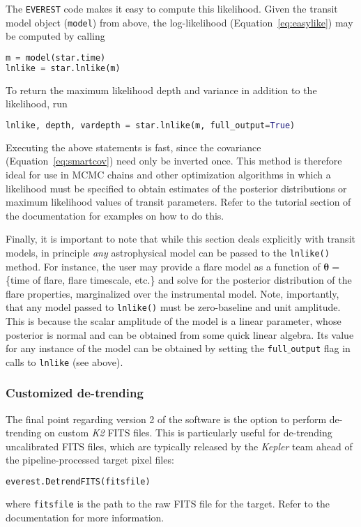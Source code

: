 \documentclass[]{emulateapj}
\newenvironment{edits}{\color{red}}{\color{black}}
\begin{document}
\begin{edits}
The \texttt{EVEREST} code makes it easy to compute this likelihood.
Given the transit model object (\texttt{model}) from above, the log-likelihood
(Equation~\ref{eq:easylike}) may be computed by calling
%
\begin{lstlisting}[language=Python]
m = model(star.time)
lnlike = star.lnlike(m)
\end{lstlisting}
%
To return the maximum likelihood depth and variance in addition to the
likelihood, run
%
\begin{lstlisting}[language=Python]
lnlike, depth, vardepth = star.lnlike(m, full_output=True)
\end{lstlisting}
%
Executing the above statements
is fast, since the covariance (Equation~\ref{eq:smartcov}) need only be
inverted once. This method is therefore ideal for use in MCMC chains and other
optimization algorithms in which a likelihood must be specified to
obtain estimates of the posterior distributions or maximum likelihood values
of transit parameters. Refer to the tutorial section of the documentation for
examples on how to do this.

Finally, it is important to note that while this section deals explicitly with
transit models, in principle \emph{any} astrophysical model can be passed to
the \texttt{lnlike()} method. For instance, the user may provide a flare model
as a function of $\mathbf{\theta} =$ \{time of flare, flare timescale, etc.\}
and solve for the posterior distribution of the flare properties, marginalized
over the instrumental model. Note, importantly, that any model passed to
\texttt{lnlike()} must be zero-baseline and unit amplitude. This is because
the scalar amplitude of the model is a linear parameter, whose posterior is
normal and can be obtained from some quick linear algebra. Its value for any
instance of the model can be obtained by setting the \texttt{full$\_$output}
flag in calls to \texttt{lnlike} (see above).\\[0em]

\subsubsection{Customized de-trending}
\label{sec:custom_detrending}
The final point regarding version 2 of the software is the option to perform
de-trending on custom \emph{K2} FITS files. This is particularly useful for de-trending
uncalibrated FITS files, which are typically released by the \emph{Kepler}
team ahead of the pipeline-processed target pixel files:
%
\begin{lstlisting}[language=Python]
everest.DetrendFITS(fitsfile)
\end{lstlisting}
%
where \texttt{fitsfile} is the path to the raw FITS file for the target.
Refer to the documentation for more information.\\[0em]
\end{edits}
\end{document}

